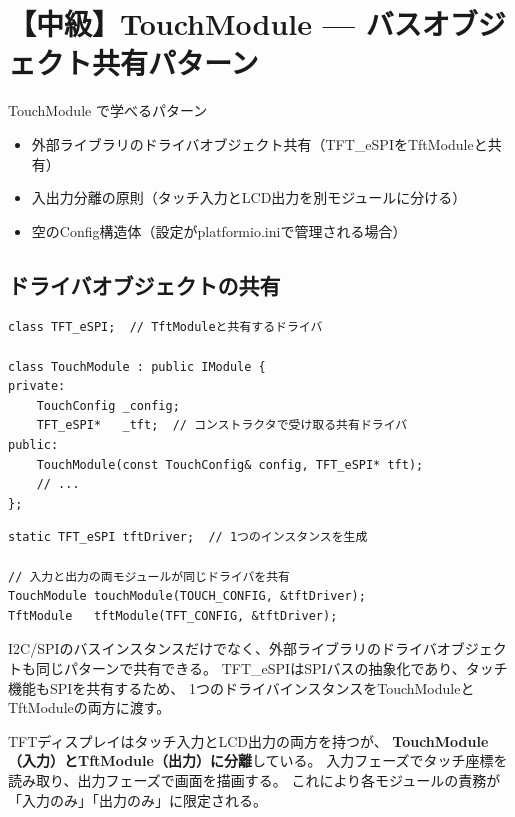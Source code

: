 \section{【中級】TouchModule — バスオブジェクト共有パターン}

\begin{patternbox}{TouchModule で学べるパターン}
\begin{itemize}
    \item 外部ライブラリのドライバオブジェクト共有（TFT\_eSPIをTftModuleと共有）
    \item 入出力分離の原則（タッチ入力とLCD出力を別モジュールに分ける）
    \item 空のConfig構造体（設定がplatformio.iniで管理される場合）
\end{itemize}
\end{patternbox}

\subsection{ドライバオブジェクトの共有}

\begin{lstlisting}[style=cppstyle, caption={TouchModule.h — TFT\_eSPIの前方宣言}]
class TFT_eSPI;  // TftModuleと共有するドライバ

class TouchModule : public IModule {
private:
    TouchConfig _config;
    TFT_eSPI*   _tft;  // コンストラクタで受け取る共有ドライバ
public:
    TouchModule(const TouchConfig& config, TFT_eSPI* tft);
    // ...
};
\end{lstlisting}

\begin{lstlisting}[style=cppstyle, caption={main.cpp — ドライバの共有}]
static TFT_eSPI tftDriver;  // 1つのインスタンスを生成

// 入力と出力の両モジュールが同じドライバを共有
TouchModule touchModule(TOUCH_CONFIG, &tftDriver);
TftModule   tftModule(TFT_CONFIG, &tftDriver);
\end{lstlisting}

\begin{pointbox}[通信バスパターンの応用]
I2C/SPIのバスインスタンスだけでなく、外部ライブラリのドライバオブジェクトも同じパターンで共有できる。
TFT\_eSPIはSPIバスの抽象化であり、タッチ機能もSPIを共有するため、
1つのドライバインスタンスをTouchModuleとTftModuleの両方に渡す。
\end{pointbox}

\begin{pointbox}[入出力分離の実例]
TFTディスプレイはタッチ入力とLCD出力の両方を持つが、
\textbf{TouchModule（入力）とTftModule（出力）に分離}している。
入力フェーズでタッチ座標を読み取り、出力フェーズで画面を描画する。
これにより各モジュールの責務が「入力のみ」「出力のみ」に限定される。
\end{pointbox}
